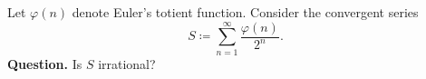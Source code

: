 Let $\varphi(n)$ denote Euler's totient function. Consider the convergent series
\[
S \coloneqq \sum_{n=1}^{\infty}\frac{\varphi(n)}{2^n}.
\]
\noindent\textbf{Question.} Is $S$ irrational?
